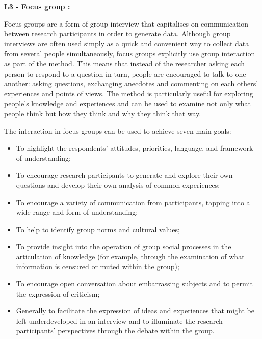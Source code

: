 \begin{tcolorbox}[breakable, enhanced]
\textbf{L3 -  Focus group \cite{Kitzinger2005}:}

\vspace{0.5cm}

\begin{fancyquotes}
Focus groups are a form of group interview that capitalises on communication between research participants in order to generate data. Although group interviews are often used simply as a quick and convenient way to collect data from several people simultaneously, focus groups explicitly use group interaction as part of the method. This means that instead of the researcher asking each person to respond to a question in turn, people are encouraged to talk to one another: asking questions, exchanging anecdotes and commenting on each others' experiences and points of views. The method is particularly useful for exploring people's knowledge and experiences and can be used to examine not only what people think but how they think and why they think that way.
\end{fancyquotes}

\vspace{0.5cm}

The interaction in focus groups can be used to achieve seven main goals:

\begin{itemize}
  \item To highlight the respondents' attitudes, priorities, language, and framework of understanding;
  \item To encourage research participants to generate and explore their own questions and develop their own analysis of common experiences;
  \item To encourage a variety of communication from participants, tapping into a wide range and form of understanding;
  \item To help to identify group norms and cultural values;
  \item To provide insight into the operation of group social processes in the articulation of knowledge (for example, through the examination of what information is censured or muted within the group);
  \item To encourage open conversation about embarrassing subjects and to permit the expression of criticism;
  \item Generally to facilitate the expression of ideas and experiences that might be left underdeveloped in an interview and to illuminate the research participants' perspectives through the debate within the group.
\end{itemize}
\end{tcolorbox}

